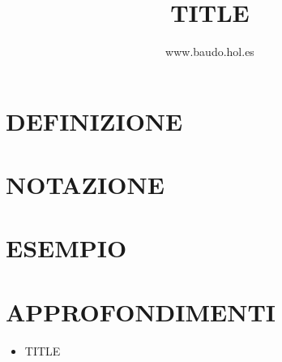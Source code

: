 \documentclass[a4paper,10pt]{article}
\title{TITLE}
\author{www.baudo.hol.es}
\begin{document}
\maketitle

\section{DEFINIZIONE}

\section{NOTAZIONE}

\section{ESEMPIO}

\section{APPROFONDIMENTI}
\begin{itemize}
 \item TITLE \cite{test}
\end{itemize}



\end{document}

